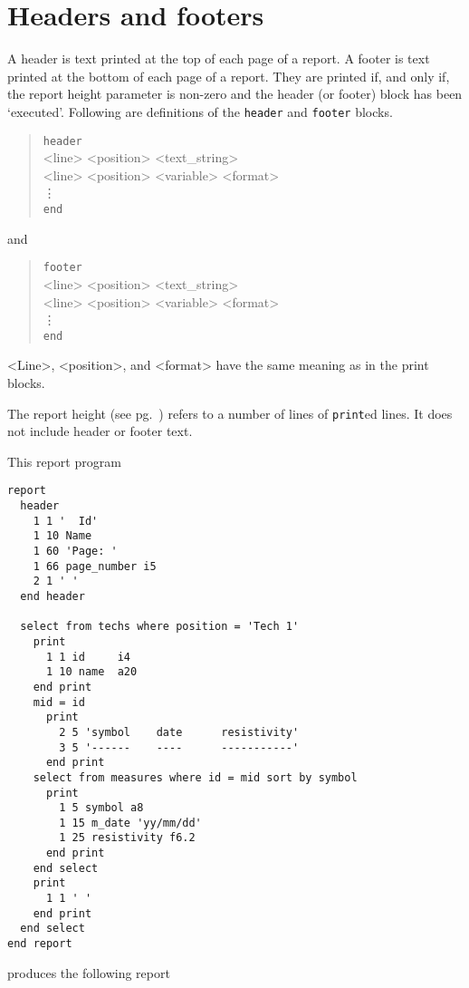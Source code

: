 \documentclass[11pt,a4paper]{report}
\begin{document}
\section{Headers and footers}
%
A header is text printed at the top of each page of a report.
A footer is text printed at the bottom of each page of a report.
They are printed if, and only if,
the report height parameter is non-zero and
the header (or footer) block has been `executed'.
Following are definitions of the \verb!header! and \verb!footer! blocks.
\begin{verse}
  \verb!header!\\
  <line> <position> <text\_string>\\
  <line> <position> <variable> <format>\\
  \qquad  \vdots\\
  \verb!end! 
\end{verse}
and
\begin{verse}
  \verb!footer!\\
  <line> <position> <text\_string>\\
  <line> <position> <variable> <format>\\
  \qquad  \vdots\\
  \verb!end! 
\end{verse}
<Line>, <position>, and <format> have the same meaning
as in the print blocks.
 
The report height (see pg.~\pageref{set-height}) refers to
a number of lines of \verb!print!ed lines.  It does not
include header or footer text.
 
\demobreak
This report program
\begin{verbatim}
report
  header
    1 1 '  Id'
    1 10 Name
    1 60 'Page: '
    1 66 page_number i5
    2 1 ' '
  end header
 
  select from techs where position = 'Tech 1'
    print
      1 1 id     i4
      1 10 name  a20
    end print
    mid = id
      print
        2 5 'symbol    date      resistivity'
        3 5 '------    ----      -----------'
      end print
    select from measures where id = mid sort by symbol
      print
        1 5 symbol a8
        1 15 m_date 'yy/mm/dd'
        1 25 resistivity f6.2
      end print
    end select
    print
      1 1 ' '
    end print
  end select
end report
\end{verbatim}
\demobreak
produces the following report
 
\end{document}

